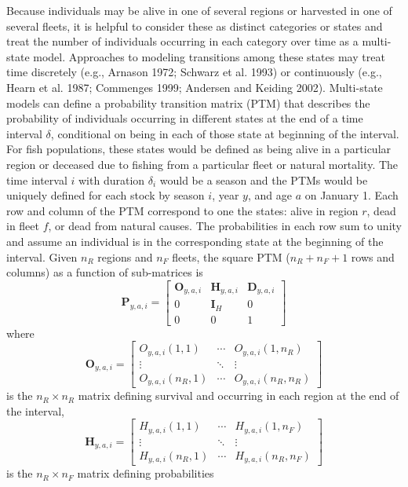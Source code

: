 \documentclass[
]{article}
\begin{document}
Because individuals may be alive in one of several regions or harvested
in one of several fleets, it is helpful to consider these as distinct
categories or states and treat the number of individuals occurring in
each category over time as a multi-state model. Approaches to modeling
transitions among these states may treat time discretely (e.g., Arnason
1972; Schwarz et al. 1993) or continuously (e.g., Hearn et al. 1987;
Commenges 1999; Andersen and Keiding 2002). Multi-state models can
define a probability transition matrix (PTM) that describes the
probability of individuals occurring in different states at the end of a
time interval \(\delta\), conditional on being in each of those state at
beginning of the interval. For fish populations, these states would be
defined as being alive in a particular region or deceased due to fishing
from a particular fleet or natural mortality. The time interval \(i\)
with duration \(\delta_i\) would be a season and the PTMs would be
uniquely defined for each stock by season \(i\), year \(y\), and age
\(a\) on January 1. Each row and column of the PTM correspond to one the
states: alive in region \(r\), dead in fleet \(f\), or dead from natural
causes. The probabilities in each row sum to unity and assume an
individual is in the corresponding state at the beginning of the
interval. Given \(n_R\) regions and \(n_F\) fleets, the square PTM
(\(n_R + n_F + 1\) rows and columns) as a function of sub-matrices is
\begin{equation}\label{eq:ptm}
  \mathbf{P}_{y,a,i} = \begin{bmatrix}
    \mathbf{O}_{y,a,i} & \mathbf{H}_{y,a,i} & \mathbf{D}_{y,a,i} \\
    0 & \mathbf{I}_{H} & 0\\
    0 & 0 & 1
  \end{bmatrix}
\end{equation} where \begin{equation*}
  \mathbf{O}_{y,a,i} = 
  \begin{bmatrix}
    O_{y,a,i}(1,1) & \cdots & O_{y,a,i}(1,n_R) \\
    \vdots & \ddots & \vdots \\
    O_{y,a,i}(n_R,1) & \cdots & O_{y,a,i}(n_R,n_R)
  \end{bmatrix}
\end{equation*} is the \(n_R \times n_R\) matrix defining survival and
occurring in each region at the end of the interval, \begin{equation*} 
  \mathbf{H}_{y,a,i} = 
  \begin{bmatrix}
    H_{y,a,i}(1,1) & \cdots & H_{y,a,i}(1,n_F) \\
    \vdots & \ddots & \vdots \\
    H_{y,a,i}(n_R,1) & \cdots & H_{y,a,i}(n_R,n_F)
  \end{bmatrix}
\end{equation*} is the \(n_R \times n_F\) matrix defining probabilities
\end{document}
